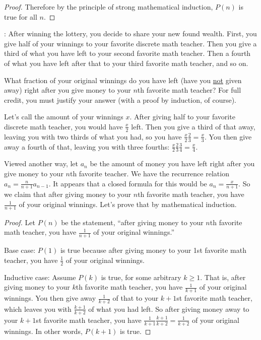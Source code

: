 \documentclass[11pt]{exam}
\begin{document}
\begin{questions}
\begin{solution}
\begin{parts}
\begin{proof}
    Therefore by the principle of strong mathematical induction, $P(n)$ is true for all $n$.
  \end{proof}
\end{parts}
\end{solution}
\newpage

: After winning the lottery, you decide to share your new found wealth.  First, you give half of your winnings to your favorite discrete math teacher.  Then you give a third of what you have left to your second favorite math teacher.  Then a fourth of what you have left after that to your third favorite math teacher, and so on.

What fraction of your original winnings do you have left (have you \underline{not} given away) right after you give money to your $n$th favorite math teacher?  For full credit, you must justify your answer (with a proof by induction, of course).

\begin{solution}
	Let's call the amount of your winnings $x$.  After giving half to your favorite discrete math teacher, you would have $\frac{x}{2}$ left.  Then you give a third of that away, leaving you with two thirds of what you had, so you have $\frac{x}{2}\frac{2}{3} = \frac{x}{3}$.  You then give away a fourth of that, leaving you with three fourths: $\frac{x}{2}\frac{2}{3}\frac{3}{4} = \frac{x}{4}$.

	Viewed another way, let $a_n$ be the amount of money you have left right after you give money to your $n$th favorite teacher.  We have the recurrence relation $a_n = \frac{n}{n+1}a_{n-1}$.  It appears that a closed formula for this would be $a_n = \frac{x}{n+1}$.  So we claim that after giving money to your $n$th favorite math teacher, you have $\frac{1}{n+1}$ of your original winnings.  Let's prove that by mathematical induction.

	\begin{proof}
		Let $P(n)$ be the statement, ``after giving money to your $n$th favorite math teacher, you have $\frac{1}{n+1}$ of your original winnings.''

		Base case: $P(1)$ is true because after giving money to your 1st favorite math teacher, you have $\frac{1}{2}$ of your original winnings.

		Inductive case: Assume $P(k)$ is true, for some arbitrary $k \ge 1$.  That is, after giving money to your $k$th favorite math teacher, you have $\frac{1}{k+1}$ of your original winnings.  You then give away $\frac{1}{k+2}$ of that to your $k+1$st favorite math teacher, which leaves you with $\frac{k+1}{k+2}$ of what you had left.  So after giving money away to your $k+1$st favorite math teacher, you have $\frac{1}{k+1}\frac{k+1}{k+2} = \frac{1}{k+2}$ of your original winnings.  In other words, $P(k+1)$ is true.


\end{proof}
\end{solution}
\end{questions}
\end{document}
